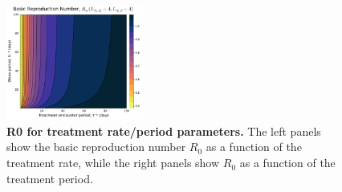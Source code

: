 \documentclass[12pt]{article}
\begin{document}
\begin{figure}[H]
    \includegraphics[width=0.4\textwidth]{../../fig/gen_model/R0_periods_txh_4x4.pdf}
    \caption{\textbf{R0 for treatment rate/period parameters.} The left panels show the basic reproduction number \(R_0\) as a function of the treatment rate, while the right panels show \(R_0\) as a function of the treatment period.}
\end{figure}
\end{document}
